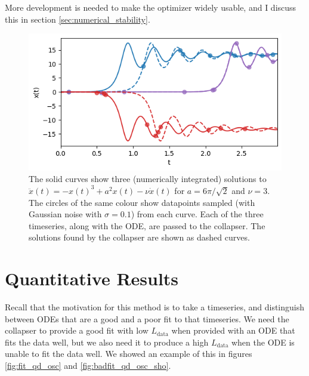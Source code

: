 \documentclass{article}
\begin{document}
More development is needed to make the optimizer widely usable, and I discuss this in section \ref{sec:numerical_stability}.

\begin{figure}
\includegraphics{images/results/double_well_collapser.png}
\centering
\caption{
The solid curves show three (numerically integrated) solutions to $\ddot{x}(t) = -x(t)^3 + a^2 x(t) - \nu \dot{x}(t)$ for $a = 6\pi / \sqrt{2}$ and $\nu = 3$.
The circles of the same colour show datapoints sampled (with Gaussian noise with $\sigma = 0.1$) from each curve.
Each of the three timeseries, along with the ODE, are passed to the collapser.
The solutions found by the collapser are shown as dashed curves.
}
\label{fig:double_well_collapser}
\end{figure}

\section{Quantitative Results}
\label{sec:quant_results}

Recall that the motivation for this method is to take a timeseries, and distinguish between ODEs that are a good and a poor fit to that timeseries.
We need the collapser to provide a good fit with low $L_{\mathrm{data}}$ when provided with an ODE that fits the data well, but we also need it to produce a high $L_{\mathrm{data}}$ when the ODE is unable to fit the data well.
We showed an example of this in figures \ref{fig:fit_qd_osc} and \ref{fig:badfit_qd_osc_sho}.
\end{document}
